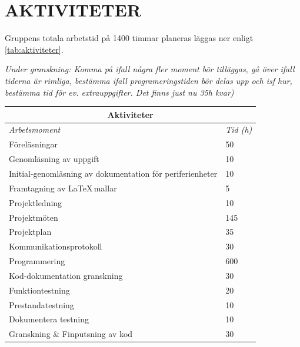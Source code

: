 \documentclass[a4paper]{article}
\begin{document}
\section{AKTIVITETER}
\label{sec:sktiviteter}
Gruppens totala arbetstid på 1400 timmar planeras läggas ner enligt \ref{tab:aktiviteter}.
\newline

\textit{Under granskning: Komma på ifall några fler moment bör tilläggas, gå över ifall tiderna är rimliga, bestämma ifall programeringstiden bör delas upp och isf hur, bestämma tid för ev. extrauppgifter. Det finns just nu 35h kvar)}
\begin{table}[b]
\begin{tabular}{|l|l|}
\hline
\multicolumn{2}{|c|}{\textbf{Aktiviteter}}                                   \\ \hline
\textit{Arbetsmoment}                                     & \textit{Tid (h)} \\ \hline
Föreläsningar                                             & 50               \\
Genomläsning av uppgift                                   & 10               \\
Initial-genomläsning av dokumentation för periferienheter & 10               \\
Framtagning av \LaTeX \,mallar                            & 5                \\
Projektledning                                            & 10               \\
Projektmöten                                              & 145              \\
Projektplan                                               & 35               \\
Kommunikationsprotokoll                                   & 30               \\
Programmering                                             & 600              \\
Kod-dokumentation granskning                              & 30               \\
Funktiontestning                                          & 20               \\
Prestandatestning                                         & 10               \\
Dokumentera testning                                      & 10               \\
Granskning \& Finputsning av kod                          & 30               \\

\end{tabular}
\end{table}
\end{document}
